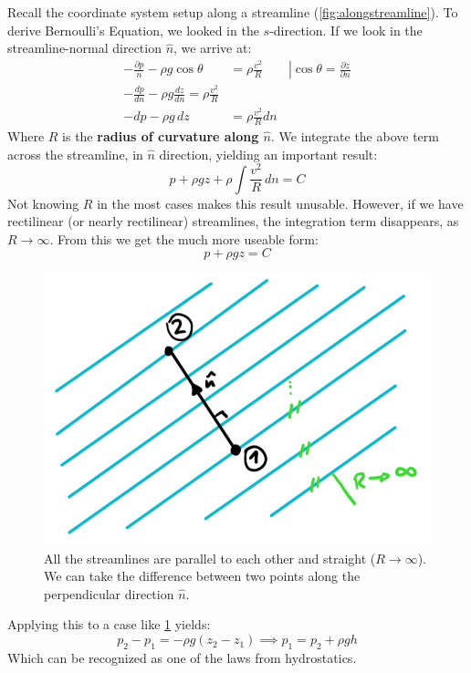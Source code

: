 Recall the coordinate system setup along a streamline (\ref{fig:alongstreamline}). To derive Bernoulli's Equation, we looked in the $s$-direction. If we look in the streamline-normal direction $\hat n$, we arrive at:
\begin{equation*}
	\begin{split}
		-\frac{\partial p}{n}-\rho g \cos \theta &= \rho \frac {v^2}R\qquad \left| \cos \theta= \frac{\partial z}{\partial n}\right.\\
		-\frac {dp}{dn}-\rho g \frac{dz}{dn} = \rho \frac{v^2}R\\
		-dp - \rho g \,dz &= \rho \frac{v^2}R dn
	\end{split}
\end{equation*}
Where $R$ is the \textbf{radius of curvature along $\hat n$}. We integrate the above term across the streamline, in $\hat n$ direction, yielding an important result:
\begin{equation}
		 \boxed{p + \rho gz + \rho \int \frac{v^2}{R}\,dn = C}
\end{equation}
Not knowing $R$ in the most cases makes this result unusable. However, if we have rectilinear (or nearly rectilinear) streamlines, the integration term disappears, as $R \to \infty$. From this we get the much more useable form:
\begin{equation}
	\boxed{p + \rho gz = C}
\end{equation}
\begin{figure}[H]
	\centering
	\includegraphics[width=0.4\linewidth]{Sketches/RectilinearStreamLines}
	\caption{All the streamlines are parallel to each other and straight ($R\to \infty$). We can take the difference between two points along the perpendicular direction $\hat n$.}
	\label{fig:rectilinearstreamlines}
\end{figure}
Applying this to a case like \ref{fig:rectilinearstreamlines} yields:
\begin{equation}
	p_2-p_1 = -\rho g (z_2-z_1) \implies p_1 = p_2+\rho gh
\end{equation}
Which can be recognized as one of the laws from hydrostatics.